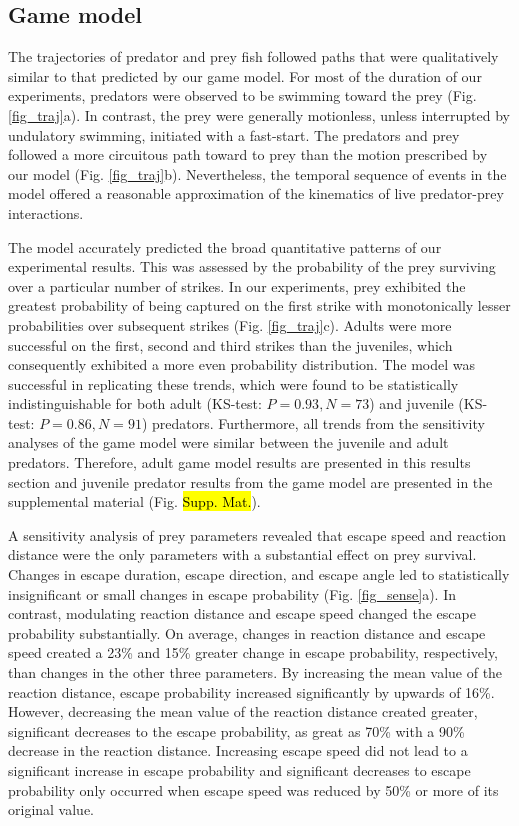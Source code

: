 \documentclass[]{rsos}%
\begin{document}
\subsection{Game model} %
The trajectories of predator and prey fish followed paths that were qualitatively similar to that predicted by our game model.
For most of the duration of our experiments, predators were observed to be swimming toward the prey (Fig. \ref{fig_traj}a). 
In contrast, the prey were generally motionless, unless interrupted by undulatory swimming, initiated with a fast-start.
The predators and prey followed a more circuitous path toward to prey than the motion prescribed by our model (Fig. \ref{fig_traj}b).
Nevertheless, the temporal sequence of events in the model offered a reasonable approximation of the kinematics of live predator-prey interactions.

The model accurately predicted the broad quantitative patterns of our experimental results.
This was assessed by the probability of the prey surviving over a particular number of strikes. 
In our experiments, prey exhibited the greatest probability of being captured on the first strike with monotonically lesser probabilities over subsequent strikes (Fig. \ref{fig_traj}c).
Adults were more successful on the first, second and third strikes than the juveniles, which consequently exhibited a more even probability distribution.
The model was successful in replicating these trends, which were found to be statistically indistinguishable for both adult (KS-test: $P = 0.93, N = 73$) and juvenile (KS-test: $P = 0.86, N = 91$) predators. 
Furthermore, all trends from the sensitivity analyses of the game model were similar between the juvenile and adult predators. 
Therefore, adult game model results are presented in this results section and juvenile predator results from the game model are presented in the supplemental material (Fig. \hl{Supp. Mat.}).


A sensitivity analysis of prey parameters revealed that escape speed and reaction distance were the only parameters with a substantial effect on prey survival. 
Changes in escape duration, escape direction, and escape angle led to statistically insignificant or small changes in escape probability (Fig. \ref{fig_sense}a). 
In contrast, modulating reaction distance and escape speed changed the escape probability substantially.
On average, changes in reaction distance and escape speed created a 23\% and 15\% greater change in escape probability, respectively, than changes in the other three parameters.
By increasing the mean value of the reaction distance, escape probability increased significantly by upwards of 16\%. 
However, decreasing the mean value of the reaction distance created greater, significant decreases to the escape probability, as great as 70\% with a  90\% decrease in the reaction distance. 
Increasing escape speed did not lead to a significant increase in escape probability and significant decreases to escape probability only occurred when escape speed was reduced by 50\% or more of its original value.
\end{document}
